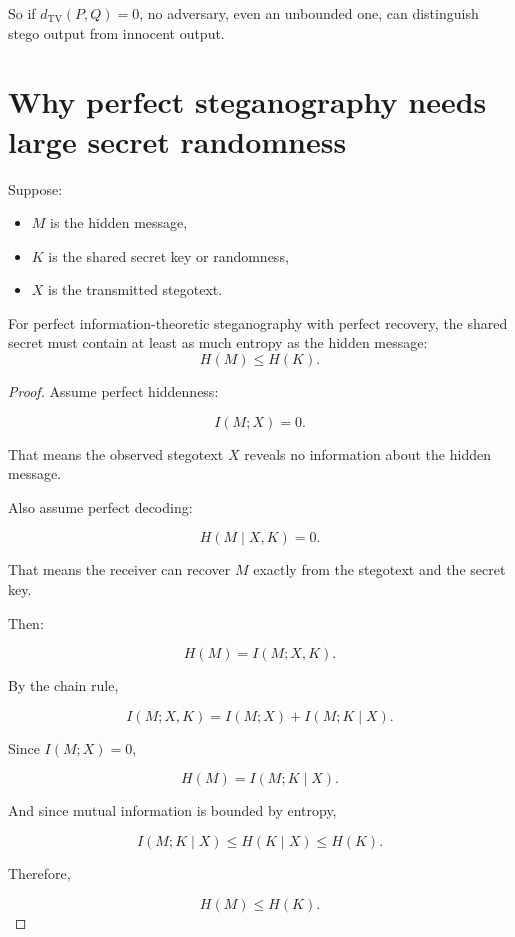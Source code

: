 \documentclass[11pt]{article}
\begin{document}
So if $d_{\mathrm{TV}}(P,Q)=0$, no adversary, even an unbounded one, can distinguish stego output from innocent output.

\section{Why perfect steganography needs large secret randomness}

Suppose:

\begin{itemize}
    \item $M$ is the hidden message,
    \item $K$ is the shared secret key or randomness,
    \item $X$ is the transmitted stegotext.
\end{itemize}

\begin{theorem}
\label{thm:key-entropy}
For perfect information-theoretic steganography with perfect recovery, the shared secret must contain at least as much entropy as the hidden message:
\[
\boxed{H(M)\le H(K).}
\]
\end{theorem}

\begin{proof}
Assume perfect hiddenness:

\[
I(M;X)=0.
\]

That means the observed stegotext $X$ reveals no information about the hidden message.

Also assume perfect decoding:

\[
H(M \mid X,K)=0.
\]

That means the receiver can recover $M$ exactly from the stegotext and the secret key.

Then:

\[
H(M)=I(M;X,K).
\]

By the chain rule,

\[
I(M;X,K)
=
I(M;X)+I(M;K\mid X).
\]

Since $I(M;X)=0$,

\[
H(M)=I(M;K\mid X).
\]

And since mutual information is bounded by entropy,

\[
I(M;K\mid X)\le H(K\mid X)\le H(K).
\]

Therefore,

\[
H(M)\le H(K).
\]
\end{proof}
\end{document}
